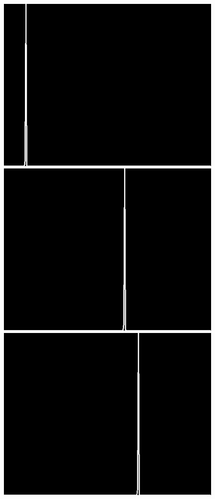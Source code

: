 \documentclass[12pt]{report}
\begin{document}
\begin{figure}[H]
\begin{center}
\includegraphics[scale=0.25]{../ImageRes/dct_masked3_histo_0.jpg} 
\includegraphics[scale=0.25]{../ImageRes/dct_masked3_histo_1.jpg} 
\includegraphics[scale=0.25]{../ImageRes/dct_masked3_histo_2.jpg} 

\end{center}
\end{figure}
\end{document}
